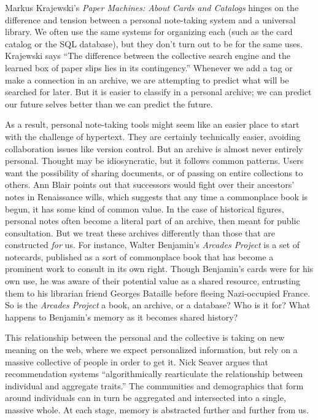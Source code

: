 Markus Krajewski's \emph{Paper Machines: About Cards and Catalogs} hinges on the difference and tension between a personal note-taking system and a universal library. We often use the same systems for organizing each (such as the card catalog or the SQL database), but they don't turn out to be for the same uses. Krajewski says ``The difference between the collective search engine and the learned box of paper slips lies in its contingency.''\autocite[50]{krajewski_paper_2011} Whenever we add a tag or make a connection in an archive, we are attempting to predict what will be searched for later. But it is easier to classify in a personal archive; we can predict our future selves better than we can predict the future.

As a result, personal note-taking tools might seem like an easier place to start with the challenge of hypertext. They are certainly technically easier, avoiding collaboration issues like version control. But an archive is almost never entirely personal. Thought may be idiosyncratic, but it follows common patterns. Users want the possibility of sharing documents, or of passing on entire collections to others. Ann Blair points out that successors would fight over their ancestors' notes in Renaissance wills, which suggests that any time a commonplace book is begun, it has some kind of common value.\autocite[104]{blair_note_2004} In the case of historical figures, personal notes often become a literal part of an archive, then meant for public consultation. But we treat these archives differently than those that are constructed \emph{for} us. For instance, Walter Benjamin's \emph{Arcades Project} is a set of notecards, published as a sort of commonplace book that has become a prominent work to consult in its own right. Though Benjamin's cards were for his own use, he was aware of their potential value as a shared resource, entrusting them to his librarian friend Georges Bataille before fleeing Nazi-occupied France. So is the \emph{Arcades Project} a book, an archive, or a database? Who is it for? What happens to Benjamin's memory as it becomes shared history?

This relationship between the personal and the collective is taking on new meaning on the web, where we expect personalized information, but rely on a massive collective of people in order to get it. Nick Seaver argues that recommendation systems ``algorithmically rearticulate the relationship between individual and aggregate traits.''\autocite{seaver_algorithmic_2012} The communities and demographics that form around individuals can in turn be aggregated and intersected into a single, massive whole. At each stage, memory is abstracted further and further from us.

